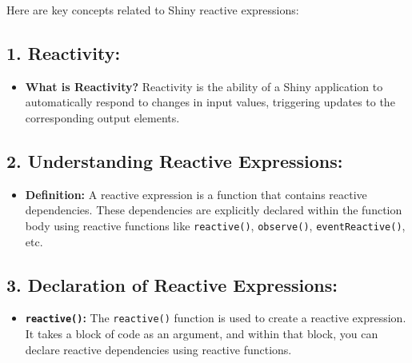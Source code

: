 \documentclass[
]{book}
\newenvironment{Shaded}{\begin{snugshade}}{\end{snugshade}}
\newcommand{\CommentTok}[1]{\textcolor[rgb]{0.56,0.35,0.01}{\textit{#1}}}
\newcommand{\FunctionTok}[1]{\textcolor[rgb]{0.13,0.29,0.53}{\textbf{#1}}}
\newcommand{\NormalTok}[1]{#1}
\newcommand{\OtherTok}[1]{\textcolor[rgb]{0.56,0.35,0.01}{#1}}
\newcommand{\SpecialCharTok}[1]{\textcolor[rgb]{0.81,0.36,0.00}{\textbf{#1}}}
\providecommand{\tightlist}{%
  \setlength{\itemsep}{0pt}\setlength{\parskip}{0pt}}
\begin{document}
Here are key concepts related to Shiny reactive expressions:

\hypertarget{reactivity}{%
\subsection{\texorpdfstring{1. \textbf{Reactivity:}}{1. Reactivity:}}\label{reactivity}}

\begin{itemize}
\tightlist
\item
  \textbf{What is Reactivity?} Reactivity is the ability of a Shiny application to automatically respond to changes in input values, triggering updates to the corresponding output elements.
\end{itemize}

\hypertarget{understanding-reactive-expressions}{%
\subsection{\texorpdfstring{2. \textbf{Understanding Reactive Expressions:}}{2. Understanding Reactive Expressions:}}\label{understanding-reactive-expressions}}

\begin{itemize}
\tightlist
\item
  \textbf{Definition:} A reactive expression is a function that contains reactive dependencies. These dependencies are explicitly declared within the function body using reactive functions like \texttt{reactive()}, \texttt{observe()}, \texttt{eventReactive()}, etc.
\end{itemize}

\hypertarget{declaration-of-reactive-expressions}{%
\subsection{\texorpdfstring{3. \textbf{Declaration of Reactive Expressions:}}{3. Declaration of Reactive Expressions:}}\label{declaration-of-reactive-expressions}}

\begin{itemize}
\tightlist
\item
  \textbf{\texttt{reactive()}:} The \texttt{reactive()} function is used to create a reactive expression. It takes a block of code as an argument, and within that block, you can declare reactive dependencies using reactive functions.
\end{itemize}

\begin{Shaded}
\end{Shaded}
\end{document}
